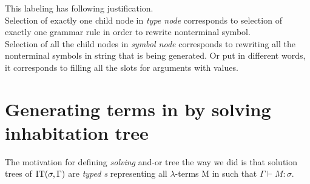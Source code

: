 \documentclass[12pt,a4paper]{report}
\newcommand{\lterms}{$\lambda$-terms\xspace}
\newcommand{\turst}[3]{$#1\vdash{}#2:#3$\xspace}
\newcommand{\GMS}{\turst{\Gamma}{M}{\sigma}}
\begin{document}
This labeling has following justification.\\

Selection of exactly one
child node in \textit{type node} corresponds to selection of exactly one
grammar rule in order to rewrite nonterminal symbol.  \\

Selection of all the child nodes in \textit{symbol node} corresponds to 
rewriting all the nonterminal symbols in string that is being generated.
Or put in different words, it corresponds to filling all the slots
for arguments with values.\\  

\newpage
\section{ Generating terms in \lnf by solving inhabitation tree }

The motivation for defining \textit{solving} and-or tree the way we did is that
solution trees of $\mathop{\mathrm{IT}}(\sigma,\Gamma)$ are  
\textit{typed \sexprTree{}s} representing all \lterms M in \lnf such that \GMS.
\end{document}
